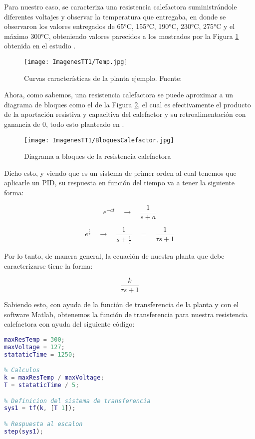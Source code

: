 \documentclass[14pt,oneside]{extarticle} %
\begin{document}
Para nuestro caso, se caracteriza una resistencia calefactora suministrándole diferentes voltajes y observar la temperatura que entregaba, en donde se observaron los valores entregados de 65°C, 155°C, 190°C, 230°C, 275°C y el máximo 300°C, obteniendo valores parecidos a los mostrados por la Figura \ref{fig:Temp} obtenida en el estudio \cite{rosales2020}.

\begin{figure}[h!]
    \centering
    \texttt{[image: ImagenesTT1/Temp.jpg]}
    \caption{Curvas características de la planta ejemplo. Fuente: \cite{rosales2020}}
    \label{fig:Temp}
\end{figure}

\newpage

Ahora, como sabemos, una resistencia calefactora se puede aproximar a un diagrama de bloques como el de la Figura \ref{fig:Bloques}, el cual es efectivamente el producto de la aportación resistiva y capacitiva del calefactor y su retroalimentación con ganancia de 0, todo esto planteado en \cite{ogata2003}.

\begin{figure}[h!]
    \centering
    \texttt{[image: ImagenesTT1/BloquesCalefactor.jpg]}
    \caption{Diagrama a bloques de la resistencia calefactora}
    \label{fig:Bloques}
\end{figure}

Dicho esto, y viendo que es un sistema de primer orden al cual tenemos que aplicarle un PID, su respuesta en función del tiempo va a tener la siguiente forma:

\[
e^{-at} \quad \longrightarrow \quad \frac{1}{s + a}
\]

\[
e^{\frac{t}{\tau}} \quad \longrightarrow \quad \frac{1}{s + \frac{1}{\tau}} \quad = \quad \frac{1}{\tau s + 1}
\]

Por lo tanto, de manera general, la ecuación de nuestra planta que debe caracterizarse tiene la forma:

\[
\frac{k}{\tau s + 1} 
\]

Sabiendo esto, con ayuda de la función de transferencia de la planta y con el software Matlab, obtenemos la función de transferencia para nuestra resistencia calefactora con ayuda del siguiente código:

\begin{lstlisting}[language=Matlab]
maxResTemp = 300;
maxVoltage = 127;
stataticTime = 1250;

% Calculos
k = maxResTemp / maxVoltage;
T = stataticTime / 5;

% Definicion del sistema de transferencia
sys1 = tf(k, [T 1]);

% Respuesta al escalon
step(sys1);
\end{lstlisting}
\end{document}
